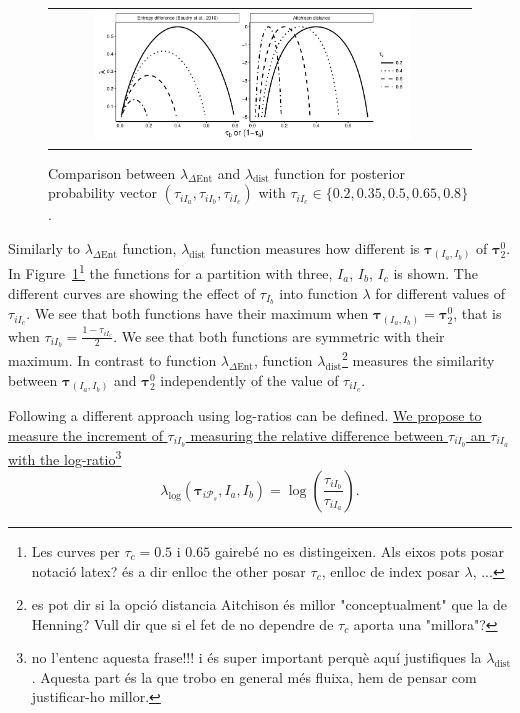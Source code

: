 \documentclass[submit]{smj}
\theoremstyle{definition}
\newcommand{\m}[1]{\boldsymbol{#1}}
\begin{document}
\begin{figure}[htbp]
\begin{center}
\begin{tabular}{cc}
  \includegraphics[width=0.8\textwidth]{figures/entr_dist.pdf} \\
 \end{tabular}
 \caption{Comparison between $\lambda_{\Delta\text{Ent}}$ and $\lambda_{\text{dist}}$ function for posterior probability 
vector $\left(\tau_{iI_a}, \tau_{iI_b}, \tau_{iI_c} \right)$ with $\tau_{iI_c} \in \{0.2, 0.35, 0.5, 0.65, 0.8\}$.} 
\label{symetric}
\end{center}
\end{figure}

Similarly to $\lambda_{\Delta\text{Ent}}$ function, $\lambda_{\text{dist}}$ function measures how different is $\m\tau_{\left(I_a, I_b\right)}$ of $\m\tau_2^0$. In Figure~\ref{symetric}\footnote{Les curves per $\tau_c=0.5$ i $0.65$ gairebé no es distingeixen.
Als eixos pots posar notació latex? és a dir enlloc the other posar $\tau_c$, enlloc de index posar $\lambda$, ...} the functions for a partition with three, $I_a$, $I_b$, $I_c$ is shown. The different curves are showing the effect of $\tau_{I_b}$ into function $\lambda$ for different values of $\tau_{iI_c}$. We see that both functions have their maximum when $\m\tau_{\left(I_a, I_b\right)} = \m\tau_2^0$, that is when $\tau_{i I_b} = \frac{1-\tau_{i I_c}}{2}$. We see that both functions are symmetric with their maximum. In contrast to function $\lambda_{\Delta\text{Ent}}$, function $\lambda_{\text{dist}}$\footnote{es pot dir si la opció distancia Aitchison és millor "conceptualment" que la de Henning? Vull dir que si el fet de no dependre de $\tau_c$ aporta una "millora"?} measures the similarity between $\m\tau_{\left(I_a, I_b\right)}$ and $\m\tau_2^0$ independently of the value of $\tau_{i I_c}$.

Following \cite{longford2014} a different approach using log-ratios can be defined. \ul{We propose to measure the increment of $\tau_{iI_b}$ measuring the relative difference between $\tau_{iI_b}$ an $\tau_{iI_a}$ with the log-ratio}\footnote{no l'entenc aquesta frase!!! i és super important perquè aquí justifiques la $\lambda_{\text{dist}}$.  Aquesta part és la que trobo en general més fluixa, hem de pensar com justificar-ho millor.}
\[
\lambda_{\log}(\m\tau_{i \mathcal{P}_s},  I_a,  I_b) = \log \left(\frac{ \tau_{iI_b} }{ \tau_{iI_a} }\right).
\]
\end{document}
